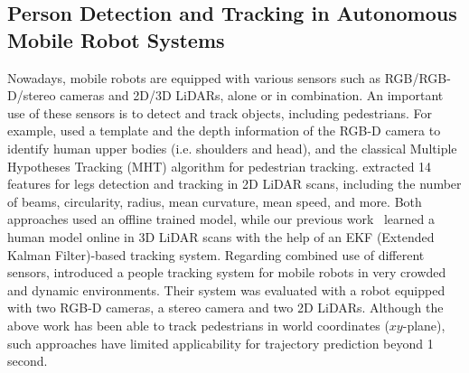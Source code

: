 \documentclass[letterpaper, 10 pt, conference]{ieeeconf}  %
\begin{document}
\subsection{Person Detection and Tracking in Autonomous Mobile Robot Systems}
Nowadays, mobile robots are equipped with various sensors such as RGB/RGB-D/stereo cameras and 2D/3D LiDARs, alone or in combination.
An important use of these sensors is to detect and track objects, including pedestrians. 
For example, \cite{jafari14icra} used a template and the depth information of the RGB-D camera to identify human upper bodies (i.e. shoulders and head), and the classical Multiple Hypotheses Tracking (MHT) algorithm for pedestrian tracking.
\cite{arras07icra} extracted 14 features for legs detection and tracking in 2D LiDAR scans, including the number of beams, circularity, radius, mean curvature, mean speed, and more.
Both approaches used an offline trained model, while our previous work~\cite{yz17iros} learned a human model online in 3D LiDAR scans with the help of an EKF (Extended Kalman Filter)-based tracking system.
Regarding combined use of different sensors, \cite{linder16icra} introduced a people tracking system for mobile robots in very crowded and dynamic environments.
Their system was evaluated with a robot equipped with two RGB-D cameras, a stereo camera and two 2D LiDARs.
Although the above work has been able to track pedestrians in world coordinates ($xy$-plane), 
such approaches have limited applicability for trajectory prediction beyond 1 second.
\end{document}
